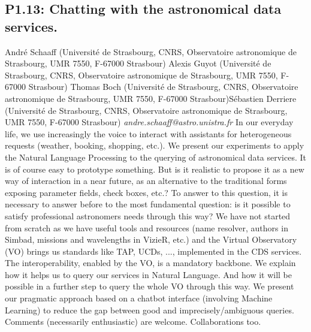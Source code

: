 \documentclass{report}
\begin{document}
\subsection*{P1.13: Chatting with the astronomical data services.}
\bigskip
André Schaaff (Université de Strasbourg, CNRS, Observatoire astronomique de Strasbourg, UMR 7550, F-67000 Strasbour) \newline Alexis Guyot (Université de Strasbourg, CNRS, Observatoire astronomique de Strasbourg, UMR 7550, F-67000 Strasbour) \newline  Thomas Boch (Université de Strasbourg, CNRS, Observatoire astronomique de Strasbourg, UMR 7550, F-67000 Strasbour)\newline  Sébastien Derriere (Université de Strasbourg, CNRS, Observatoire astronomique de Strasbourg, UMR 7550, F-67000 Strasbour)\newline  \newline  \newline\newline
{\it andre.schaaff@astro.unistra.fr}\newline
\newline\newline
In our everyday life, we use increasingly the voice to interact with assistants for heterogeneous requests (weather, booking, shopping, etc.). We present our experiments to apply the Natural Language Processing to the querying of astronomical data services. It is of course easy to prototype something. But is it realistic to propose it as a new way of interaction in a near future, as an alternative to the traditional forms exposing parameter fields, check boxes, etc.? 
To answer to this question, it is necessary to answer before to the most fundamental question: is it possible to satisfy professional astronomers needs through this way? 
We have not started from scratch as we have useful tools and resources (name resolver, authors in Simbad, missions and wavelengths in VizieR, etc.) and the Virtual Observatory (VO) brings us standards like TAP, UCDs, ..., implemented in the CDS services. 
The interoperability, enabled by the VO, is a mandatory backbone. We explain how it helps us to query our services in Natural Language. And how it will be possible in a further step to query the whole VO through this way. We present our pragmatic approach based on a chatbot interface (involving Machine Learning) to reduce the gap between good and imprecisely/ambiguous queries. Comments (necessarily enthusiastic) are welcome. Collaborations too.\newline
\newpage
\end{document}

